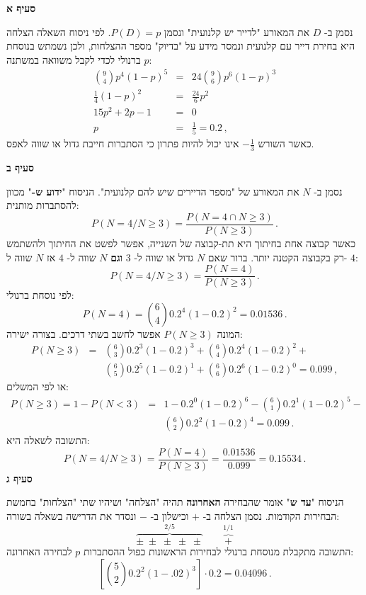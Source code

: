 \textbf{סעיף א}

נסמן ב-%
$D$
את המאורע "לדייר יש קלנועית" ונסמן
$P(D)=p$.
לפי ניסוח השאלה הצלחה היא בחירת דייר עם קלנועית ונמסר מידע על "בדיוק" מספר ההצלחות, ולכן נשמתש בנוסחת ברנולי לכדי לקבל משוואה במשתנה 
$p$:
\begin{eqnarray*}
{9\choose 4} p^4 (1-p)^5&=&24 {9\choose 6} p^6 (1-p)^3\\
\frac{1}{4}(1-p)^2&=&\frac{24}{6}p^2\\
15p^2+2p-1&=&0\\
p&=&\frac{1}{5}=0.2\,,
\end{eqnarray*}
כאשר השורש 
$-\frac{1}{3}$
אינו יכול להיות פתרון כי הסתברות חייבת גדול או שווה לאפס.

\textbf{סעיף ב}

נסמן ב-%
$N$
את המאורע של "מספר הדיירים שיש להם קלנועית". הניסוח
"\textbf{ידוע ש-}"
מכוון להסתברות מותנית:
\[
P(N=4/N\ge3) = \frac{P(N=4\cap N\ge 3)}{P(N\ge 3)}\,.
\]
כאשר קבוצה אחת בחיתוך היא תת-קבוצה של השנייה, אפשר לפשט את החיתוך ולהשתמש רק בקבוצה הקטנה יותר. ברור שאם 
$N$
גדול או שווה ל-%
$3$
\textbf{וגם}
$N$
שווה ל-%
$4$
אז
$N$
שווה ל-%
$4$:
\[
P(N=4/N\ge3) =\frac{P(N=4)}{P(N\ge 3)}\,.
\]
לפי נוסחת ברנולי:
\[
P(N=4)={6\choose 4} 0.2^4 (1-0.2)^2= 0.01536\,.
\]
המונה
$P(N\ge 3)$
אפשר לחשב בשתי דרכים. בצורה ישירה:
\begin{eqnarray*}
P(N\ge 3)&=&{6\choose 3}0.2^3(1-0.2)^3+{6\choose 4}0.2^4(1-0.2)^2+\\
&&{6 \choose 5} 0.2^5(1-0.2)^1+ {6 \choose 6} 0.2^6(1-0.2)^0=0.099\,,
\end{eqnarray*}
או לפי המשלים:
\begin{eqnarray*}
P(N\ge 3)=1-P(N<3)&=&
1-0.2^0(1-0.2)^6-{6\choose 1}0.2^1(1-0.2)^5 -\\
&&{6 \choose 2} 0.2^2(1-0.2)^4=0.099\,.
\end{eqnarray*}
התשובה לשאלה היא:
\[
P(N=4/N\ge3) =\displaystyle\frac{P(N=4)}{P(N\ge 3)}=\displaystyle\frac{0.01536}{0.099}=0.15534\,.
\]
\textbf{סעיף ג}

הניסוח 
"\textbf{עד ש}"
אומר שהבחירה 
\textbf{האחרונה} 
תהיה "הצלחה" ושיהיו שתי "הצלחות" בחמשת הבחירות הקודמות. נסמן הצלחה ב-%
$+$
וכישלון ב-%
$-$
ונסדר את הדרישה בשאלה בשורה:
\[
\overbrace{\pm\;\pm\;\pm\;\pm\;\pm}^{2/5}\quad\quad \overbrace{+}^{1/1}
\]
התשובה מתקבלת מנוסחת ברנולי לבחירות הראשונות כפול ההסתברות
$p$
לבחירה האחרונה:
\[
\left[{5\choose 2}0.2^2 (1-.02)^3\right]\cdot 0.2=0.04096\,.
\]


